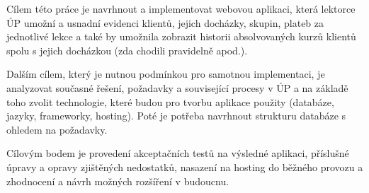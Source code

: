 Cílem této práce je navrhnout a implementovat webovou aplikaci, která lektorce ÚP umožní a usnadní evidenci klientů, jejich docházky, skupin,  plateb za jednotlivé lekce a také by umožnila zobrazit historii absolvovaných kurzů klientů spolu s jejich docházkou (zda chodili pravidelně apod.).

Dalším cílem, který je nutnou podmínkou pro samotnou implementaci, je analyzovat současné řešení, požadavky a související procesy v ÚP a na základě toho zvolit technologie, které budou pro tvorbu aplikace použity (databáze, jazyky, frameworky, hosting). Poté je potřeba navrhnout strukturu databáze s ohledem na požadavky.

Cílovým bodem je provedení akceptačních testů na výsledné aplikaci, příslušné úpravy a opravy zjištěných nedostatků, nasazení na hosting do běžného provozu a zhodnocení a návrh možných rozšíření v budoucnu.